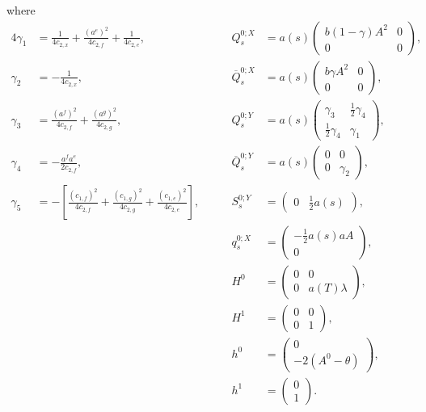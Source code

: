 \documentclass[11pt,twoside]{amsart}
\theoremstyle{definition}
\numberwithin{equation}{section}
\renewcommand{\bar}{\overline}
\begin{document}
where 
\begin{alignat*}{4}
    \gamma_1 &= \frac{1}{4c_{2,x}} + \frac{(a^e)^2}{4c_{2,f}} + \frac{1}{4c_{2,e}}, \qquad&
    Q^{0;X}_s &= a(s) \begin{pmatrix} b(1-\gamma)A^2 & 0 \\ 0 & 0 \end{pmatrix}, \\[6pt]
    \gamma_2 &= -\frac{1}{4c_{2,x}}, \qquad&
    \bar{Q}^{0;X}_s &= a(s) \begin{pmatrix} b\gamma A^2 & 0 \\ 0 & 0 \end{pmatrix}, \\[6pt]
    \gamma_3 &= \frac{(a^f)^2}{4c_{2,f}} + \frac{(a^g)^2}{4c_{2,g}}, \qquad&
    Q^{0;Y}_s &= a(s) \begin{pmatrix} \gamma_3 & \frac{1}{2}\gamma_4 \\ \frac{1}{2}\gamma_4 & \gamma_1 \end{pmatrix}, \\[6pt]
    \gamma_4 &= -\frac{a^f a^e}{2c_{2,f}}, \qquad&
    \bar{Q}^{0;Y}_s &= a(s) \begin{pmatrix} 0 & 0 \\ 0 & \gamma_2 \end{pmatrix}, \\[6pt]
    \gamma_5 &= -\left[ \frac{(c_{1,f})^2}{4c_{2,f}} + \frac{(c_{1,g})^2}{4c_{2,g}} + \frac{(c_{1,e})^2}{4c_{2,e}} \right], \qquad&
    S^{0;Y}_s &= \begin{pmatrix} 0 & \frac{1}{2}a(s) \end{pmatrix}, \\[6pt]
    & &
    q^{0;X}_s &= \begin{pmatrix} -\frac{1}{2}a(s)aA \\ 0 \end{pmatrix}, \\[6pt]
    & &
    H^0 &= \begin{pmatrix} 0 & 0 \\ 0 & a(T)\lambda \end{pmatrix}, \\[6pt]
    & &
    H^1 &= \begin{pmatrix} 0 & 0 \\ 0 & 1 \end{pmatrix}, \\[6pt]
    & &
    h^0 &= \begin{pmatrix} 0 \\ -2(A^0 - \theta) \end{pmatrix}, \\[6pt]
    & &
    h^1 &= \begin{pmatrix} 0 \\ 1 \end{pmatrix}.
\end{alignat*}
\end{document}

